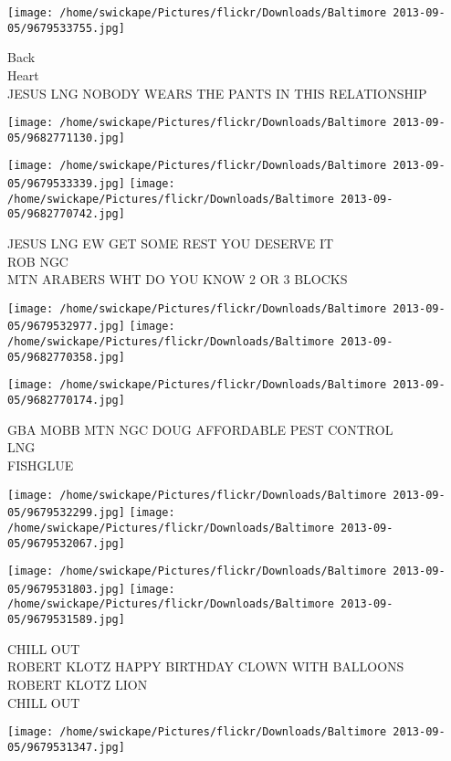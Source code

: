 \documentclass[10pt,letterpaper]{article}
\begin{document}
\texttt{[image: /home/swickape/Pictures/flickr/Downloads/Baltimore 2013-09-05/9679533755.jpg]}

Back\\
Heart\\
JESUS LNG NOBODY WEARS THE PANTS IN THIS RELATIONSHIP
\pagebreak

\texttt{[image: /home/swickape/Pictures/flickr/Downloads/Baltimore 2013-09-05/9682771130.jpg]}

\vspace{0.25in}
\texttt{[image: /home/swickape/Pictures/flickr/Downloads/Baltimore 2013-09-05/9679533339.jpg]}
\texttt{[image: /home/swickape/Pictures/flickr/Downloads/Baltimore 2013-09-05/9682770742.jpg]}

JESUS LNG EW GET SOME REST YOU DESERVE IT\\
ROB NGC\\
MTN ARABERS WHT DO YOU KNOW 2 OR 3 BLOCKS
\pagebreak

\texttt{[image: /home/swickape/Pictures/flickr/Downloads/Baltimore 2013-09-05/9679532977.jpg]}
\texttt{[image: /home/swickape/Pictures/flickr/Downloads/Baltimore 2013-09-05/9682770358.jpg]}

\vspace{0.25in}
\texttt{[image: /home/swickape/Pictures/flickr/Downloads/Baltimore 2013-09-05/9682770174.jpg]}

GBA MOBB MTN NGC DOUG AFFORDABLE PEST CONTROL\\
LNG\\
FISHGLUE
\pagebreak

\texttt{[image: /home/swickape/Pictures/flickr/Downloads/Baltimore 2013-09-05/9679532299.jpg]}
\texttt{[image: /home/swickape/Pictures/flickr/Downloads/Baltimore 2013-09-05/9679532067.jpg]}

\texttt{[image: /home/swickape/Pictures/flickr/Downloads/Baltimore 2013-09-05/9679531803.jpg]}
\texttt{[image: /home/swickape/Pictures/flickr/Downloads/Baltimore 2013-09-05/9679531589.jpg]}

CHILL OUT\\
ROBERT KLOTZ HAPPY BIRTHDAY CLOWN WITH BALLOONS\\
ROBERT KLOTZ LION\\
CHILL OUT
\pagebreak

\texttt{[image: /home/swickape/Pictures/flickr/Downloads/Baltimore 2013-09-05/9679531347.jpg]}
\end{document}

